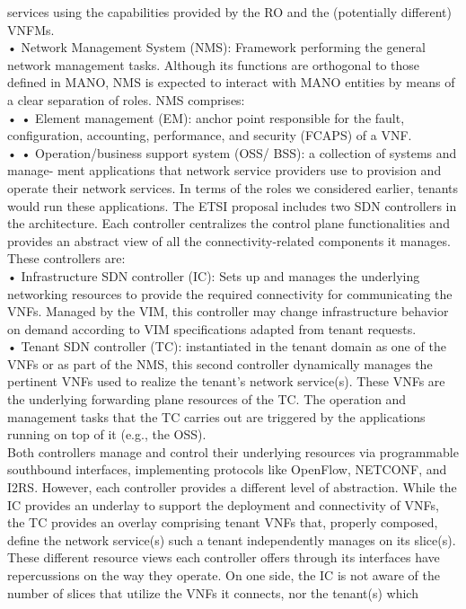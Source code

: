 \documentclass{article}
\begin{document}
services using the capabilities provided by the
RO and the (potentially different) VNFMs.\\
• Network Management System (NMS): Framework performing the general network management tasks. Although its functions are orthogonal
to those defined in MANO, NMS is expected to
interact with MANO entities by means of a clear
separation of roles. NMS comprises:\\
• • Element management (EM): anchor point
responsible for the fault, configuration,
accounting, performance, and security
(FCAPS) of a VNF.\\
• • Operation/business support system (OSS/
BSS): a collection of systems and manage-
ment applications that network service providers use to provision and operate their network
services. In terms of the roles we considered
earlier, tenants would run these applications.
The ETSI proposal includes two SDN controllers
in the architecture. Each controller centralizes
the control plane functionalities and provides an
abstract view of all the connectivity-related components it manages. These controllers are:\\
• Infrastructure SDN controller (IC): Sets up
and manages the underlying networking resources to provide the required connectivity for communicating the VNFs.
Managed by the VIM, this controller may change
infrastructure behavior on demand according to
VIM specifications adapted from tenant requests.\\
• Tenant SDN controller (TC): instantiated in
the tenant domain as one of the VNFs or as
part of the NMS, this second controller dynamically manages the pertinent VNFs used to realize
the tenant’s network service(s). These VNFs are
the underlying forwarding plane resources of the
TC. The operation and management tasks that the
TC carries out are triggered by the applications
running on top of it (e.g., the OSS).\\
Both controllers manage and control their
underlying resources via programmable southbound interfaces, implementing protocols like
OpenFlow, NETCONF, and I2RS. However, each
controller provides a different level of abstraction. While the IC provides an underlay to support
the deployment and connectivity of VNFs, the
TC provides an overlay comprising tenant VNFs
that, properly composed, define the network service(s) such a tenant independently manages on
its slice(s). These different resource views each
controller offers through its interfaces have repercussions on the way they operate. On one side,
the IC is not aware of the number of slices that utilize the VNFs it connects, nor the tenant(s) which
\end{document}

